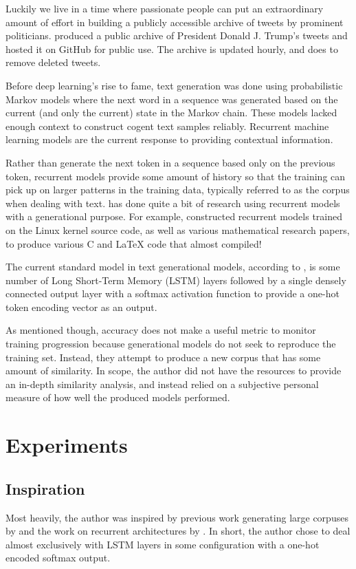 \documentclass[letterpaper]{article}
\begin{document}
    Luckily we live in a time where passionate people can put an extraordinary amount of effort in building a publicly accessible archive of tweets by prominent politicians. \citet{brown_2017} produced a public archive of President Donald J. Trump's tweets and hosted it on GitHub for public use. The archive is updated hourly, and does to remove deleted tweets.

    Before deep learning's rise to fame, text generation was done using probabilistic Markov models where the next word in a sequence was generated based on the current (and only the current) state in the Markov chain. These models lacked enough context to construct cogent text samples reliably. Recurrent machine learning models are the current response to providing contextual information.

    Rather than generate the next token in a sequence based only on the previous token, recurrent models provide some amount of history so that the training can pick up on larger patterns in the training data, typically referred to as the corpus when dealing with text. \citet{karpathy_2015} has done quite a bit of research using recurrent models with a generational purpose. For example, \citet{karpathy_2015} constructed recurrent models trained on the Linux kernel source code, as well as various mathematical research papers, to produce various C and \LaTeX{} code that almost compiled!

    The current standard model in text generational models, according to \citet{karpathy_2015}, is some number of Long Short-Term Memory (LSTM) layers followed by a single densely connected output layer with a softmax activation function to provide a one-hot token encoding vector as an output.

    As mentioned though, accuracy does not make a useful metric to monitor training progression because generational models do not seek to reproduce the training set. Instead, they attempt to produce a new corpus that has some amount of similarity. In scope, the author did not have the resources to provide an in-depth similarity analysis, and instead relied on a subjective personal measure of how well the produced models performed.

\section{Experiments}
    \subsection{Inspiration}
        Most heavily, the author was inspired by previous work generating large corpuses by \citet{thoutt_2017} and the work on recurrent architectures by \citet{karpathy_2015}. In short, the author chose to deal almost exclusively with LSTM layers in some configuration with a one-hot encoded softmax output.
\end{document}
